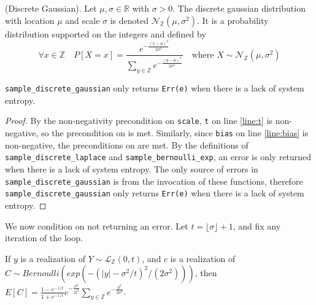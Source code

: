 \documentclass{article}
\begin{document}
\begin{definition} 
    (Discrete Gaussian). \cite{CKS20} Let $\mu, \sigma \in \mathbb{R}$ with $\sigma > 0$.  
    The discrete gaussian distribution with location $\mu$ and scale $\sigma$ is denoted $\mathcal{N}_\mathbb{Z}(\mu, \sigma^2)$.  
    It is a probability distribution supported on the integers and defined by 
    \begin{equation*} 
        \forall x \in \mathbb{Z} \quad  P[X = x] = \frac{e^{-\frac{(x - \mu)^2}{2\sigma^2}}}{\sum_{y\in\mathbb{Z}}e^{-\frac{(y - \mu)^2}{2\sigma^2}}} \quad \text{where } X \sim \mathcal{N}_\mathbb{Z}(\mu, \sigma^2) 
    \end{equation*} 
\end{definition} 
 
 
\begin{lemma} 
    \label{err-e} 
    \texttt{sample\_discrete\_gaussian} only returns \texttt{Err(e)} when there is a lack of system entropy. 
\end{lemma} 
 
\begin{proof} 
    By the non-negativity precondition on \texttt{scale}, \texttt{t} on line \ref{line:t} is non-negative,  
    so the precondition on  is met. 
    Similarly, since \texttt{bias} on line \ref{line:bias} is non-negative, the preconditions on  are met. 
    By the definitions of \texttt{sample\_discrete\_laplace} and \texttt{sample\_bernoulli\_exp}, an error is only returned when there is a lack of system entropy. 
    The only source of errors in \texttt{sample\_discrete\_gaussian} is from the invocation of these functions, 
    therefore \texttt{sample\_discrete\_gaussian} only returns \texttt{Err(e)} when there is a lack of system entropy. 
\end{proof} 
 
We now condition on not returning an error. 
Let $t = \lfloor \sigma \rfloor + 1$, and fix any iteration of the loop.  
 
\begin{lemma}\cite{CKS20} 
    \label{E_C} 
    If $y$ is a realization of $Y \sim \mathcal{L}_\mathbb{Z}(0, t)$, and $c$ is a realization of $C \sim Bernoulli(exp(-(|y| - \sigma^2 / t)^2 / (2 \sigma^2)))$, then 
    $E[C] = \frac{1 - e^{-1/t}}{1 + e^{-1/t}}e^{-\frac{\sigma^2}{2t^2}} \sum_{y\in \mathbb{Z}} e^{-\frac{y^2}{2\sigma^2}}$. 
\end{lemma} 
 
\end{document}
